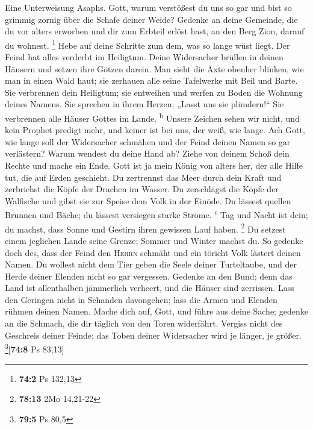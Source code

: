 Eine Unterweisung Asaphs. Gott, warum verstößest du uns
so gar und bist so grimmig zornig über die Schafe deiner Weide?
 Gedenke an deine Gemeinde, die du vor alters erworben und
dir zum Erbteil erlöst hast, an den Berg Zion, darauf du wohnest.
\footnote{\textbf{74:2} Ps 132,13}  Hebe auf deine
Schritte zum dem, was so lange wüst liegt. Der Feind hat alles verderbt
im Heiligtum.  Deine Widersacher brüllen in deinen Häusern
und setzen ihre Götzen darein.  Man sieht die Äxte obenher
blinken, wie man in einen Wald haut;  sie zerhauen alle
seine Tafelwerke mit Beil und Barte.  Sie verbrennen dein
Heiligtum; sie entweihen und werfen zu Boden die Wohnung deines Namens.
 Sie sprechen in ihrem Herzen; „Lasst uns sie
plündern!{}`` Sie verbrennen alle Häuser Gottes im Lande.
\textsuperscript{b}  Unsere Zeichen sehen wir nicht, und
kein Prophet predigt mehr, und keiner ist bei uns, der weiß, wie lange.
 Ach Gott, wie lange soll der Widersacher schmähen und
der Feind deinen Namen so gar verlästern?  Warum wendest
du deine Hand ab? Ziehe von deinem Schoß dein Rechte und mache ein Ende.
 Gott ist ja mein König von alters her, der alle Hilfe
tut, die auf Erden geschieht.  Du zertrennst das Meer
durch dein Kraft und zerbrichst die Köpfe der Drachen im Wasser.
 Du zerschlägst die Köpfe der Walfische und gibst sie zur
Speise dem Volk in der Einöde.  Du lässest quellen
Brunnen und Bäche; du lässest versiegen starke Ströme.
\textsuperscript{c}  Tag und Nacht ist dein; du machst,
dass Sonne und Gestirn ihren gewissen Lauf haben. \footnote{\textbf{78:13}
  2Mo 14,21-22}  Du setzest einem jeglichen Lande seine
Grenze; Sommer und Winter machst du.  So gedenke doch
des, dass der Feind den \textsc{Herrn} schmäht und ein töricht Volk
lästert deinen Namen.  Du wollest nicht dem Tier geben
die Seele deiner Turteltaube, und der Herde deiner Elenden nicht so gar
vergessen.  Gedenke an den Bund; denn das Land ist
allenthalben jämmerlich verheert, und die Häuser sind zerrissen.
 Lass den Geringen nicht in Schanden davongehen; lass die
Armen und Elenden rühmen deinen Namen.  Mache dich auf,
Gott, und führe aus deine Sache; gedenke an die Schmach, die dir täglich
von den Toren widerfährt.  Vergiss nicht des Geschreis
deiner Feinde; das Toben deiner Widersacher wird je länger, je größer.
\footnote{\textbf{79:5} Ps 80,5}{[}\textbf{74:8} Ps 83,13{]}

